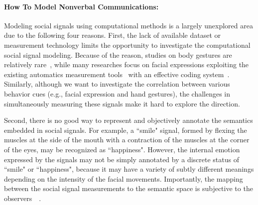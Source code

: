 \paragraph{How To Model Nonverbal Communications:} 
Modeling social signals using computational methods is a largely unexplored area due to the following four reasons. First, the lack of available dataset or measurement technology limits the opportunity to investigate the computational social signal modeling. Because of the reason, studies on body gestures are relatively rare~\cite{gunes2006bimodal, banziger2012introducing, de2004modeling}, while many researches focus on facial expressions exploiting the existing automatics measurement tools~\cite{Torre15} with an effective coding system~\cite{ekman1977facial}. Similarly, although we want to investigate the correlation between various behavior cues (e.g., facial expression and hand gestures), the challenges in simultaneously measuring these signals make it hard to explore the direction.

Second, there is no good way to represent and objectively annotate the semantics embedded in social signals. For example, a ``smile" signal, formed by flexing the muscles at the side of the mouth with a contraction of the muscles at the corner of the eyes, may be recognized as ``happiness". However, the internal emotion expressed by the signals may not be simply annotated by a discrete status of ``smile" or ``happiness", because it may have a variety of subtly different meanings depending on the intensity of the facial movements. Importantly, the mapping between the social signal measurements to the semantic space is subjective to the observers~~\cite{steidl2005all}.

